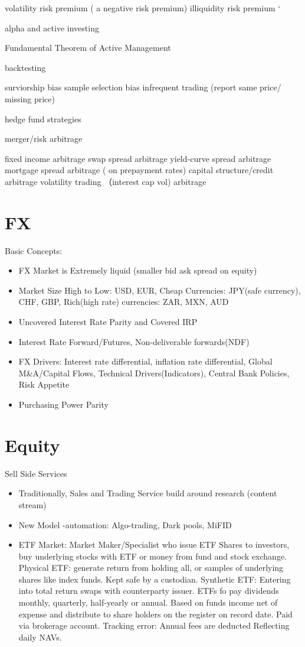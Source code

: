\documentclass[11pt, openany]{book}              %
\begin{document}
volatility risk premium ( a negative risk premium)
illiquidity risk premium ‘


alpha and active investing


Fundamental Theorem of Active Management


backtesting

  surviorship bias
  sample selection bias
  infrequent trading (report same price/ missing price) 



hedge fund strategies

  merger/risk arbitrage

   fixed income arbitrage
       swap spread arbitrage
       yield-curve spread arbitrage
      mortgage spread arbitrage ( on prepayment rates)
      capital structure/credit arbitrage 
      volatility trading （interest cap vol) arbitrage
\section{FX}

Basic Concepts:
\begin{itemize}
    \item FX Market is Extremely liquid (smaller bid ask spread on equity) 
    \item Market Size High to Low: USD, EUR, Cheap Currencies: JPY(safe currency), CHF, GBP, Rich(high rate) currencies: ZAR, MXN, AUD 
    \item Uncovered Interest Rate Parity and Covered IRP
    \item Interest Rate Forward/Futures, Non-deliverable forwards(NDF)
    \item FX Drivers: Interest rate differential, inflation rate differential, Global M\&A/Capital Flows, Technical Drivers(Indicators), Central Bank Policies, Risk Appetite
    \item Purchasing Power Parity
\end{itemize}

\section{Equity}
Sell Side Services
\begin{itemize}
    \item Traditionally, Sales and Trading Service build around research (content stream)
    \item New Model -automation: Algo-trading, Dark pools, MiFID
    \item ETF Market: Market Maker/Specialist who issue ETF Shares to investors, buy underlying stocks with ETF or money from fund and stock exchange.
    	\subitem Physical ETF: generate return from holding all, or samples of underlying shares like index funds. Kept safe by a custodian.
    	\subitem Synthetic ETF: Entering into total return swaps with counterparty issuer. 
   		\subitem ETFs fo pay dividends monthly, quarterly, half-yearly or annual. Based on funds income net of expense and distribute to share holders on the register on record date. Paid via brokerage account. 
   		\subitem Tracking error: Annual fees are deducted Reflecting daily NAVs. 
\end{itemize}
\end{document}
